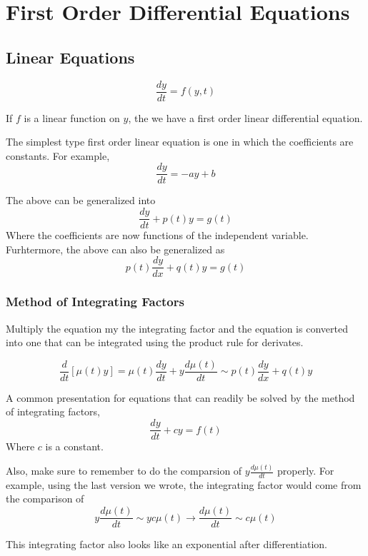 \section{First Order Differential Equations}

\subsection{Linear Equations}

$$
\frac{dy}{dt} = f(y,t)
$$

If $f$ is a linear function on $y$, the we have a first order linear differential equation.

The simplest type first order linear equation is one in which the coefficients are constants.
For example,
$$
\frac{dy}{dt} = -ay + b
$$

The above can be generalized into
$$
\frac{dy}{dt} + p(t) y = g(t)
$$
Where the coefficients are now functions of the independent variable.
Furhtermore, the above can also be generalized as
$$
p(t) \frac{dy}{dx} + q(t)y = g(t)
$$

\subsubsection{Method of Integrating Factors}

Multiply the equation my the integrating factor and the equation is converted into one that can
be integrated using the product rule for derivates.


$$
\frac{d}{dt} \left[ \mu(t)y \right] =
\mu(t) \frac{dy}{dt} + y \frac{d\mu(t)}{dt} \sim p(t) \frac{dy}{dx} + q(t)y
$$

A common presentation for equations
that can readily be solved by the method of integrating factors,
$$
\frac{dy}{dt} + cy = f(t)
$$
Where $c$ is a constant.

Also, make sure to remember to do the comparsion of $y \frac{d\mu(t)}{dt}$ properly.
For example, using the last version we wrote, the integrating factor would come from the comparison of
$$
y \frac{d\mu(t)}{dt} \sim y c\mu(t) \rightarrow \frac{d\mu(t)}{dt} \sim c\mu(t)
$$

This integrating factor also looks like an exponential after differentiation.



